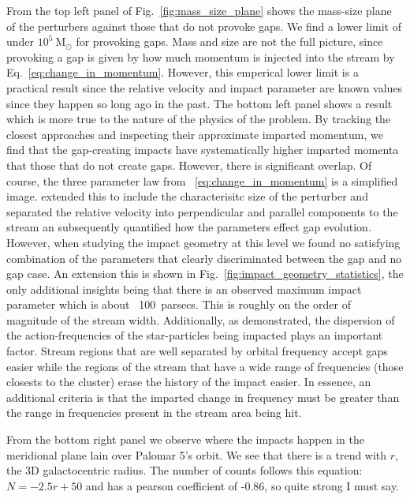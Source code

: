 \documentclass{aa}
\begin{document}
      From the top left panel of Fig.~\ref{fig:mass_size_plane} shows the mass-size plane of the perturbers against those that do not provoke gaps. We find a lower limit of under $10^5~\textrm{M}_{\odot}$ for provoking gaps. Mass and size are not the full picture, since provoking a gap is given by how much momentum is injected into the stream by Eq.~\ref{eq:change_in_momentum}. However, this emperical lower limit is a practical result since the relative velocity and impact parameter are known values since they happen so long ago in the past. The bottom left panel shows a result which is more true to the nature of the physics of the problem. By tracking the closest approaches and inspecting their approximate imparted momentum, we find that the gap-creating impacts have systematically higher imparted momenta that those that do not create gaps. However, there is significant overlap. Of course, the three parameter law from ~\ref{eq:change_in_momentum} is a simplified image. \citet{2015MNRAS.450.1136E} extended this to include the characterisitc size of the perturber and separated the relative velocity into perpendicular and parallel components to the stream an subsequently quantified how the parameters effect gap evolution. However, when studying the impact geometry at this level we found no satisfying combination of the parameters that clearly discriminated between the gap and no gap case. An extension this is shown in Fig.~\ref{fig:impact_geometry_statistics}, the only additional insights being that there is an observed maximum impact parameter which is about ~100~parsecs. This is roughly on the order of magnitude of the stream width. Additionally, as \citet{2016MNRAS.457.3817S} demonstrated, the dispersion of the action-frequencies of the star-particles being impacted plays an important factor. Stream regions that are well separated by orbital frequency accept gaps easier while the regions of the stream that have a wide range of frequencies (those closests to the cluster) erase the history of the impact easier. In essence, an additional criteria is that the imparted change in frequency must be greater than the range in frequencies present in the stream area being hit. 


      From the bottom right panel we observe where the impacts happen in the meridional plane lain over Palomar 5's orbit. We see that there is a trend with $r$, the 3D galactocentric radius. The number of counts follows this equation: $N = -2.5 r + 50$ and has a pearson coefficient of -0.86, so quite strong I must say.
\end{document}
